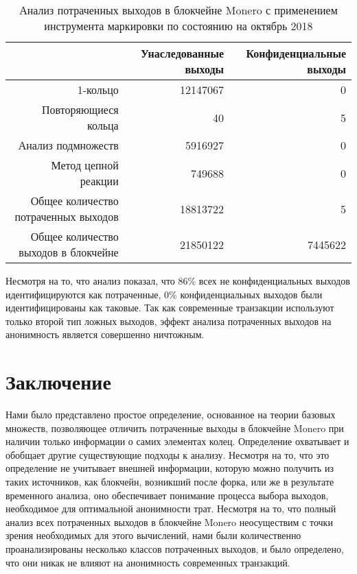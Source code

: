 \documentclass{mrl}
\begin{document}
\begin{table}[ht]
\begin{center}
\begin{tabular}{rrr}
& Унаследованные выходы & Конфиденциальные выходы \\
\hline
1-кольцо & 12147067 & 0 \\
Повторяющиеся кольца & 40 & 5 \\
Анализ подмножеств & 5916927 & 0 \\
Метод цепной реакции & 749688 & 0 \\
\hline
Общее количество потраченных выходов & 18813722 & 5 \\
Общее количество выходов в блокчейне & 21850122 & 7445622 \\
\end{tabular}
\caption{Анализ потраченных выходов в блокчейне Monero с применением инструмента маркировки по состоянию на октябрь 2018}
\label{table:spent}
\end{center}
\end{table}

Несмотря на то, что анализ показал, что 86\% всех не конфиденциальных выходов идентифицируются как потраченные, 0\% конфиденциальных выходов были идентифицированы как таковые. Так как современные транзакции используют только второй тип ложных выходов, эффект анализа потраченных выходов на анонимность является совершенно ничтожным.

\section{Заключение}
Нами было представлено простое определение, основанное на теории базовых множеств, позволяющее отличить потраченные выходы в блокчейне Monero при наличии только информации о самих элементах колец. Определение охватывает и обобщает другие существующие подходы к анализу. Несмотря на то, что это определение не учитывает внешней информации, которую можно получить из таких источников, как блокчейн, возникший после форка, или же в результате временного анализа, оно обеспечивает понимание процесса выбора выходов, необходимое для оптимальной анонимности трат. Несмотря на то, что полный анализ всех потраченных выходов в блокчейне Monero неосуществим с точки зрения необходимых для этого вычислений, нами были количественно проанализированы несколько классов потраченных выходов, и было определено, что они никак не влияют на анонимность современных транзакций.


\nocite{*}

\end{document}
